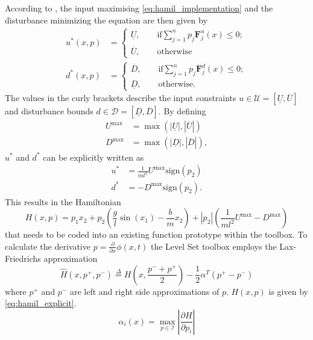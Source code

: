 \documentclass[../main.tex]{subfiles}
\begin{document}
According to \cite{mitchell2004toolbox}, the input maximising \eqref{eq:hamil_implementation} and the disturbance minimizing the equation are then given by 
\begin{align}
    u^*(x,p)&=
\begin{cases}
  \underline{U},\qquad \text{if} \sum_{j=1}^n p_j \textbf{F}^u_j(x)\leq 0;\\
  \overline{U}, \qquad \text{otherwise}
\end{cases}\\
    d^*(x,p)&=
\begin{cases}
  \overline{D},\qquad \text{if} \sum_{j=1}^n p_j \textbf{F}^d_j(x)\leq 0;\\
  \underline{D}, \qquad \text{otherwise}.
\end{cases}
\end{align}
The values in the curly brackets describe the input constraints $u\in \mathcal{U} = [\underline{U},\overline{U}]$ and disturbance bounds $d\in \mathcal{D} = [\underline{D},\overline{D}]$. By defining 
\begin{align}
    U^{\text{max}} &= \max(|\underline{U}|,|\overline{U}|) \\
    D^{\text{max}} &= \max(|\underline{D}|,|\overline{D}|), 
\end{align} 
$u^*$ and $d^*$ can be explicitly written as
\begin{align}
    u^* &= \frac{1}{ml^2} U^{\text{max}} \text{sign}(p_2)\\
    d^* &= -D^{\text{max}} \text{sign}(p_2).
\end{align}
This results in the Hamiltonian
\begin{equation}\label{eq:hamil_explicit}
    H(x,p) = p_1x_2+p_2\left(\frac{g}{l}\sin(x_1)-\frac{b}{m}x_2\right)+|p_2|\left(\frac{1}{ml^2}U^{\text{max}}-D^{\text{max}}\right)
\end{equation}
that needs to be coded into an existing function prototype within the toolbox.
To calculate the derivative $p = \frac{\partial}{\partial x} \phi(x,t)$ the Level Set toolbox employs the Lax-Friedrichs approximation 
\begin{equation}
    \hat{H}(x,p^+,p^-) \overset{\Delta}{=} H\left(x,\frac{p^-+p^+}{2}\right) - \frac{1}{2} \alpha^T(p^+-p^-)
\end{equation}
where $p^+$ and $p^-$ are left and right side approximations of $p$. $H(x,p)$ is given by \eqref{eq:hamil_explicit}.  
\begin{equation}
    \alpha_i(x) = \max_{p\in\mathcal{I}} \left|\frac{\partial H}{\partial p_i}\right|
\end{equation}
\end{document}
